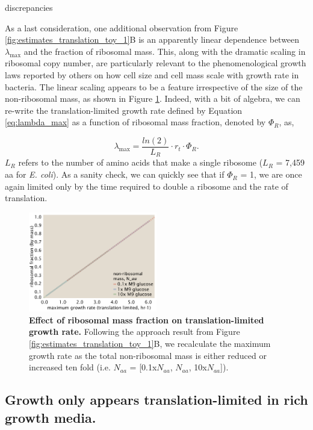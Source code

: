 discrepancies \documentclass[11pt, letterpaper]{article}
\begin{document}
As a last consideration, one additional observation from Figure \ref{fig:estimates_translation_toy_1}B
is an apparently linear dependence
between $\lambda_{\text{max}}$  and the fraction of ribosomal mass. This, along with the
dramatic scaling in ribosomal copy number, are particularly relevant to the
phenomenological growth laws reported by others on how cell size and cell mass
scale with growth rate in bacteria. The linear scaling appears to be a feature
irrespective of the size of the non-ribosomal mass, as shown in Figure
\ref{fig:estimates_translation_ribo_frac}. Indeed, with a bit of algebra, we can
re-write the translation-limited growth rate defined by Equation
\ref{eq:lambda_max} as a function of ribosomal mass fraction, denoted by
$\Phi_R$, as,

\begin{equation}
\lambda_{\text{max}} =  \frac{ln(2)} {L_R} \cdot r_t \cdot \Phi_R.
\end{equation}
$L_R$ refers to the number of amino acids that make a single
ribosome ($L_R$ = 7,459 aa for {\it E. coli}). As a sanity check, we can quickly
see that if $\Phi_R$ = 1, we are once again limited only by the time required to
double a ribosome and the rate of translation.

\begin{figure}[H]
		\centering
    \includegraphics[width=0.5\textwidth]{../../code/figures/SI/estimates_translation_ribo_frac.pdf}
  \caption{{\bf Effect of ribosomal mass fraction on translation-limited growth rate.} Following the approach
	result from Figure \ref{fig:estimates_translation_toy_1}B, we recalculate the maximum growth rate as
	the total non-ribosomal mass is either reduced or increased ten fold (i.e. $N_{aa}$ = [0.1x$N_{aa}$, $N_{aa}$, 10x$N_{aa}$]).}
  \label{fig:estimates_translation_ribo_frac}
\end{figure}


\subsection{Growth only appears translation-limited in rich growth media.}
\end{document}
